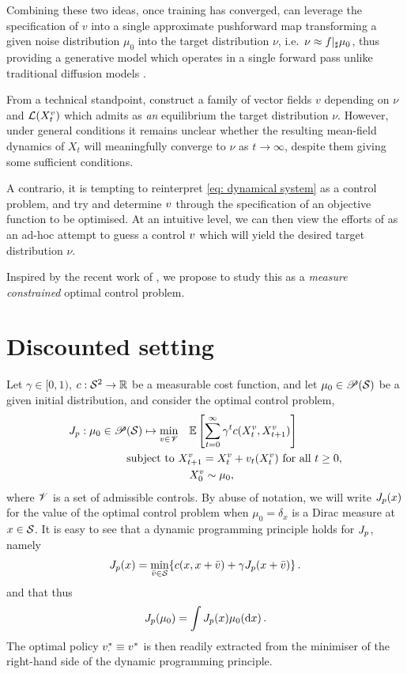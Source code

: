 \documentclass[twoside,10pt]{../jmlr}
\begin{document}
Combining these two ideas, once training has converged, \citeauthor{deng2026generative} can leverage the specification of $v$ into a single approximate pushforward map transforming a given noise distribution $\mu_0$ into the target distribution $\nu$, i.e.\ $\nu\approx f\vert_\sharp\mu_0$, thus providing a generative model which operates in a single forward pass unlike traditional diffusion models \cite{...}.

From a technical standpoint, \citeauthor{deng2026generative} construct a family of vector fields $v$ depending on $\nu$ and $\mathcal{L}(X_{t}^v)$ which admits as \emph{an} equilibrium the target distribution $\nu$. However, under general conditions it remains unclear whether the resulting mean-field dynamics of $X_t$ will meaningfully converge to $\nu$ as $t\to\infty$, despite them giving some sufficient conditions. 

A contrario, it is tempting to reinterpret \eqref{eq: dynamical system} as a control problem, and try and determine $v$ through the specification of an objective function to be optimised. At an intuitive level, we can then view the efforts of \cite{deng2026generative} as an ad-hoc attempt to guess a control $v$ which will yield the desired target distribution $\nu$. 

Inspired by the recent work of \cite{PDRLOT}, we propose to study this as a \emph{measure constrained} optimal control problem.

\section{Discounted setting}

Let $\gamma\in[0,1)$, $c: \mathcal{S}^2 \to \mathbb{R}$ be a measurable cost function, and let $\mu_0\in\mathscr{P}(\mathcal{S})$ be a given initial distribution, and consider the optimal control problem, 
\begin{align}
    J_p:\mu_0\in\mathscr{P}(\mathcal{S})\mapsto\min_{v\in\mathscr{V}}&\quad \mathbb{E}\left[\sum_{t=0}^{\infty} \gamma^t c(X_t^v, X_{t+1}^v) \right]\label{eq: optimal control problem}\\
    \mbox{ subject to }& X_{t+1}^v=X_t^v+ v_t(X_t^v) \mbox{ for all } t\ge 0,\notag \\
    &\quad X_0^v\sim\mu_0,\notag
\end{align}
where $\mathscr{V}$ is a set of admissible controls. By abuse of notation, we will write $J_p(x)$ for the value of the optimal control problem when $\mu_0=\delta_x$ is a Dirac measure at $x\in\mathcal{S}$. It is easy to see that a dynamic programming principle holds for $J_p$, namely
\begin{align}
    J_p(x)=\min_{\bar v \in\mathcal{S}}\{ c(x, x+\bar v) + \gamma J_p(x+\bar v)\}\,.
\end{align}
and that thus 
\begin{align}
    J_p(\mu_0)=\int J_p(x)\mu_0(\mathrm{d} x)\,.
\end{align}
The optimal policy $v^*_\cdot\equiv v^*$ is then readily extracted from the minimiser of the right-hand side of the dynamic programming principle.
\end{document}
